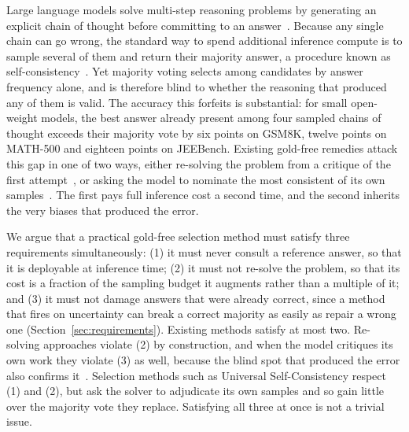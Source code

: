 Large language models solve multi-step reasoning problems by generating an
explicit chain of thought before committing to an answer~\cite{wei2022chain}. Because any single chain can go wrong, the standard
way to spend additional inference compute is to sample several of them and return their majority answer, a procedure known as self-consistency~\cite{wang2022self}. Yet majority voting selects among candidates by answer frequency alone, and is therefore blind to whether the reasoning that produced any of them is valid. The accuracy this forfeits is
substantial: for small open-weight models, the best answer already present among four sampled chains of thought exceeds their majority vote by six points on GSM8K, twelve points on MATH-500 and eighteen points on JEEBench. Existing gold-free remedies attack this gap in one of two ways, either re-solving the problem from a critique of the first attempt~\cite{madaan2023self,shinn2023reflexion}, or asking the model to nominate the most consistent of its own samples~\cite{chen2023universal}. The first pays full inference cost a second
time, and the second inherits the very biases that produced the error.

We argue that a practical gold-free selection method must satisfy three
requirements simultaneously: (1) it must never consult a reference answer, so
that it is deployable at inference time; (2) it must not re-solve the problem,
so that its cost is a fraction of the sampling budget it augments rather than a
multiple of it; and (3) it must not damage answers that were already correct,
since a method that fires on uncertainty can break a correct majority as easily
as repair a wrong one (Section~\ref{sec:requirements}). Existing methods satisfy
at most two. Re-solving approaches violate (2) by construction, and when the
model critiques its own work they violate (3) as well, because the blind spot
that produced the error also confirms it~\cite{huang2024large}. Selection
methods such as Universal Self-Consistency respect (1) and (2), but ask the
solver to adjudicate its own samples and so gain little over the majority vote
they replace. Satisfying all three at once is not a trivial issue.

